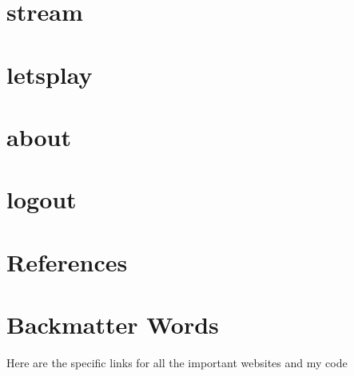 \documentclass{article}
\begin{document}
\section{stream}
\cleardoublepage

\section{letsplay}
\cleardoublepage

\section{about}
\cleardoublepage

\section{logout}
\cleardoublepage

\section{}
\cleardoublepage

\section{}
\cleardoublepage



\section{References}





\cleardoublepage




\appendix
\section{Backmatter Words}
Here are the specific links for all the important websites and my code
\end{document}
